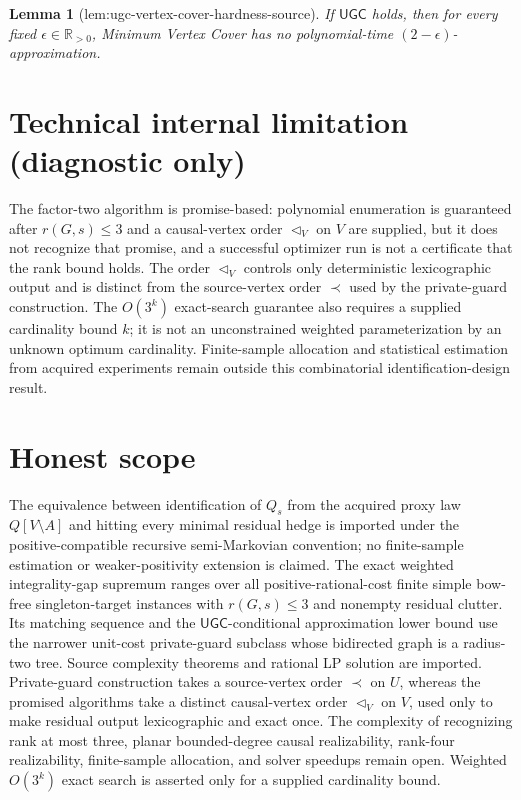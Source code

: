 \documentclass{article}
\newtheorem{lemma}{Lemma}
\begin{document}
\begin{lemma}[lem:ugc-vertex-cover-hardness-source]\label{lem:ugc-vertex-cover-hardness-source}
If \(\mathsf{UGC}\) holds, then for every fixed \(\epsilon\in\mathbb R_{>0}\), Minimum Vertex Cover has no polynomial-time \((2-\epsilon)\)-approximation.
\end{lemma}

\section*{Technical internal limitation (diagnostic only)}

The factor-two algorithm is promise-based: polynomial enumeration is guaranteed after \(r(G,s)\leq3\) and a causal-vertex order \(\triangleleft_V\) on \(V\) are supplied, but it does not recognize that promise, and a successful optimizer run is not a certificate that the rank bound holds. The order \(\triangleleft_V\) controls only deterministic lexicographic output and is distinct from the source-vertex order \(\prec\) used by the private-guard construction. The \(O(3^k)\) exact-search guarantee also requires a supplied cardinality bound \(k\); it is not an unconstrained weighted parameterization by an unknown optimum cardinality. Finite-sample allocation and statistical estimation from acquired experiments remain outside this combinatorial identification-design result.

\section{Honest scope}

The equivalence between identification of \(Q_s\) from the acquired proxy law \(Q[V\setminus A]\) and hitting every minimal residual hedge is imported under the positive-compatible recursive semi-Markovian convention; no finite-sample estimation or weaker-positivity extension is claimed. The exact weighted integrality-gap supremum ranges over all positive-rational-cost finite simple bow-free singleton-target instances with \(r(G,s)\leq3\) and nonempty residual clutter. Its matching sequence and the \(\mathsf{UGC}\)-conditional approximation lower bound use the narrower unit-cost private-guard subclass whose bidirected graph is a radius-two tree. Source complexity theorems and rational LP solution are imported. Private-guard construction takes a source-vertex order \(\prec\) on \(U\), whereas the promised algorithms take a distinct causal-vertex order \(\triangleleft_V\) on \(V\), used only to make residual output lexicographic and exact once. The complexity of recognizing rank at most three, planar bounded-degree causal realizability, rank-four realizability, finite-sample allocation, and solver speedups remain open. Weighted \(O(3^k)\) exact search is asserted only for a supplied cardinality bound.
\end{document}
